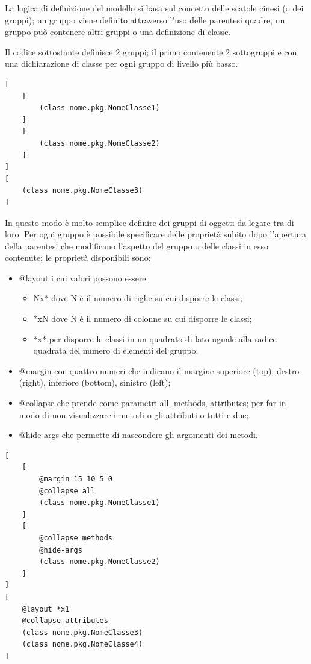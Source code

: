 La logica di definizione del modello si basa sul concetto delle scatole cinesi (o
dei gruppi); un gruppo viene definito attraverso l'uso delle parentesi quadre,
un gruppo può contenere altri gruppi o una definizione di classe.

Il codice sottostante definisce 2 gruppi; il primo contenente 2 sottogruppi e
 con una dichiarazione di classe per ogni gruppo di livello più basso.

\begin{lstlisting}[caption={Un semplice diagramma}, style={layout}] 
[
	[
		(class nome.pkg.NomeClasse1)
	]
	[
		(class nome.pkg.NomeClasse2)
	]
]
[
	(class nome.pkg.NomeClasse3)
]
\end{lstlisting}

In questo modo è molto semplice definire dei gruppi di oggetti da legare tra di
loro. Per ogni gruppo è possibile specificare delle proprietà subito dopo
l'apertura della parentesi che modificano l'aspetto del gruppo o delle classi in
esso contenute; le proprietà disponibili sono:

\begin{itemize}
  \item @layout i cui valori possono essere:
  \begin{itemize}
  	\item Nx* dove N è il numero di righe su cui disporre le classi;
  	\item *xN dove N è il numero di colonne su cui disporre le classi;
  	\item *x* per disporre le classi in un quadrato di lato uguale alla radice
  	quadrata del numero di elementi del gruppo;
  \end{itemize}
  
  \item @margin con quattro numeri che indicano il margine superiore (top),
  destro (right), inferiore (bottom), sinistro (left);
  \item @collapse che prende come parametri all, methods, attributes; per far in
  modo di non visualizzare i metodi o gli attributi o tutti e due;
  \item @hide-args che permette di nascondere gli argomenti dei metodi.
\end{itemize}

\begin{lstlisting}[caption={Diagramma decorato di attributi}, style={layout}] 
[
	[	
		@margin 15 10 5 0
		@collapse all
		(class nome.pkg.NomeClasse1)
	]
	[
		@collapse methods
		@hide-args
		(class nome.pkg.NomeClasse2)
	]
]
[
	@layout *x1
	@collapse attributes
	(class nome.pkg.NomeClasse3)
	(class nome.pkg.NomeClasse4)
]
\end{lstlisting}



